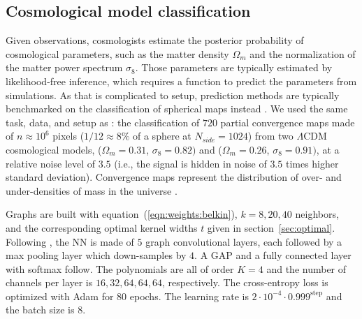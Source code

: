 \documentclass{article} %
\newcommand{\secref}[1]{section~\ref{sec:#1}}
\newcommand{\eqnref}[1]{equation~(\ref{eqn:#1})}
\begin{document}

\subsection{Cosmological model classification} \label{sec:exp:cosmo}

Given observations, cosmologists estimate the posterior probability of cosmological parameters, such as the matter density $\Omega_m$ and the normalization of the matter power spectrum $\sigma_8$.
Those parameters are typically estimated by likelihood-free inference, which requires a function to predict the parameters from simulations.
As that is complicated to setup, prediction methods are typically benchmarked on the classification of spherical maps instead \citep{schmelze2017cosmologicalmodel}.
We used the same task, data, and setup as \citet{perraudin2019deepspherecosmo}: the classification of $720$ partial convergence maps made of $n \approx 10^6$ pixels ($1/12 \approx 8\%$ of a sphere at $N_{side} = 1024$) from two $\Lambda$CDM cosmological models, ($\Omega_m = 0.31$, $\sigma_8 = 0.82)$ and ($\Omega_m = 0.26$, $\sigma_8 = 0.91)$, at a relative noise level of $3.5$ (i.e., the signal is hidden in noise of $3.5$ times higher standard deviation).
Convergence maps represent the distribution of over- and under-densities of mass in the universe \citep[see][for a review of gravitational lensing]{bartelman2010gravitationallensing}.

Graphs are built with \eqnref{weights:belkin}, $k = 8, 20, 40$ neighbors, and the corresponding optimal kernel widths $t$ given in \secref{optimal}.
Following \citet{perraudin2019deepspherecosmo}, the NN is made of $5$ graph convolutional layers, each followed by a max pooling layer which down-samples by $4$.
A GAP and a fully connected layer with softmax follow.
The polynomials are all of order $K=4$ and the number of channels per layer is $16, 32, 64, 64, 64$, respectively.
The cross-entropy loss is optimized with Adam for 80 epochs.
The learning rate is $2 \cdot 10^{-4} \cdot 0.999^{\textrm{step}}$ and the batch size is 8.
\end{document}
